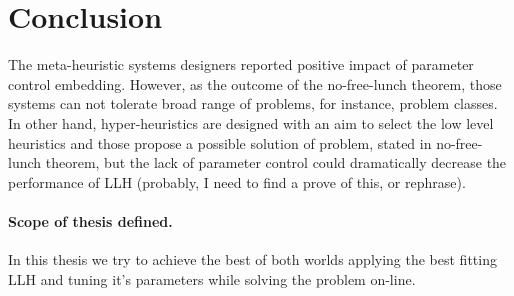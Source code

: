 \section{Conclusion}

The meta-heuristic systems designers reported positive impact of parameter control embedding. 
However, as the outcome of the no-free-lunch theorem, those systems can not tolerate broad range of problems, for instance, problem classes.
In other hand, hyper-heuristics are designed with an aim to select the low level heuristics and those propose a possible solution of problem, stated in no-free-lunch theorem, but the lack of parameter control could dramatically decrease the performance of LLH (probably, I need to find a prove of this, or rephrase).

\paragraph{Scope of thesis defined.} In this thesis we try to achieve the best of both worlds applying the best fitting LLH and tuning it's parameters while solving the problem on-line.
